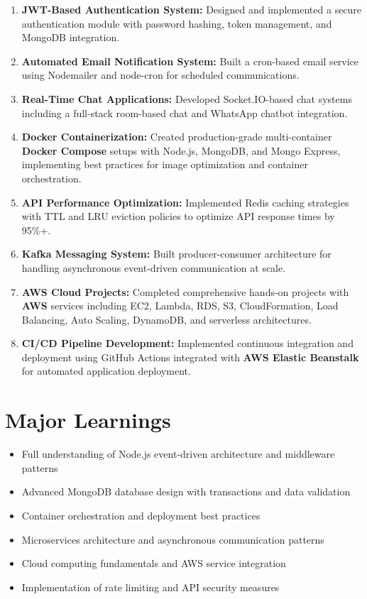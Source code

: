 \begin{enumerate}
    \item \textbf{JWT-Based Authentication System:} Designed and implemented a secure authentication module with password hashing, token management, and MongoDB integration.
    
    \item \textbf{Automated Email Notification System:} Built a cron-based email service using Nodemailer and node-cron for scheduled communications.
    
    \item \textbf{Real-Time Chat Applications:} Developed Socket.IO-based chat systems including a full-stack room-based chat and WhatsApp chatbot integration.
    
    \item \textbf{Docker Containerization:} Created production-grade multi-container \textbf{Docker Compose} setups with Node.js, MongoDB, and Mongo Express, implementing best practices for image optimization and container orchestration.
    
    \item \textbf{API Performance Optimization:} Implemented Redis caching strategies with TTL and LRU eviction policies to optimize API response times by 95\%+.
    
    \item \textbf{Kafka Messaging System:} Built producer-consumer architecture for handling asynchronous event-driven communication at scale.
    
    \item \textbf{AWS Cloud Projects:} Completed comprehensive hands-on projects with \textbf{AWS} services including EC2, Lambda, RDS, S3, CloudFormation, Load Balancing, Auto Scaling, DynamoDB, and serverless architectures.
    
    \item \textbf{CI/CD Pipeline Development:} Implemented continuous integration and deployment using GitHub Actions integrated with \textbf{AWS Elastic Beanstalk} for automated application deployment.
\end{enumerate}

\section*{Major Learnings}

\begin{itemize}
    \item Full understanding of Node.js event-driven architecture and middleware patterns
    \item Advanced MongoDB database design with transactions and data validation
    \item Container orchestration and deployment best practices
    \item Microservices architecture and asynchronous communication patterns
    \item Cloud computing fundamentals and AWS service integration
    \item Implementation of rate limiting and API security measures
\end{itemize}

